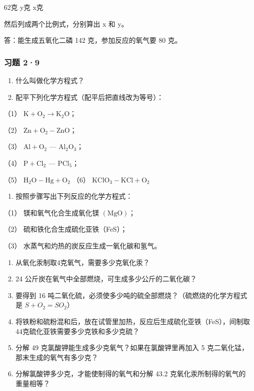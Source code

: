 62克 y克 x克

然后列成两个比例式，分别算出 x 和 y。

答：能生成五氧化二磷 142 克，参加反应的氧气要 80 克。

\subsubsection{习题 2·9}

\begin{enumerate}
\item
  什么叫做化学方程式？
\item
  配平下列化学方程式（配平后把直线改为等号）：
\end{enumerate}

（1）
\(\mathrm{K} + \mathrm{O}_2 \longrightarrow \mathrm{K}_2\mathrm{O}\)；

（2） \(\mathrm{Zn + O_2 - ZnO}\)；

（3） \(\mathrm{Al} + \mathrm{O}_2\) --- \(\mathrm{Al}_2\mathrm{O}_3\)；

（4） \(\mathrm{P} + \mathrm{Cl}_2\) --- \(\mathrm{PCl}_5\)；

（5） \(\mathrm{H}_2\mathrm{O} - \mathrm{Hg} + \mathrm{O}_2\) （6）
\(\mathrm{KClO}_3 - \mathrm{KCl} + \mathrm{O}_2\)

\begin{enumerate}[start=3]
\item
  按照步骤写出下列反应的化学方程式：
\end{enumerate}

（1） 镁和氧气化合生成氧化镁 \(\left(\mathrm{MgO}\right)\)；

（2） 硫和铁化合生成硫化亚铁（FeS）；

（3） 水蒸气和灼热的炭反应生成一氧化碳和氢气。

\begin{enumerate}[start=4]
\item
  从氧化汞制取4克氧气，需要多少克氧化汞？
\item
  24 公斤炭在氧气中全部燃烧，可生成多少公斤的二氧化碳？
\item
  要得到 16 吨二氧化硫，必须使多少吨的硫全部燃烧？（硫燃烧的化学方程式是
  \(S + O_{2} = SO_{2}\)）
\item
  将铁粉和硫粉混和后，放在试管里加热，反应后生成硫化亚铁（FeS），间制取44克硫化亚铁需要多少克铁和多少克硫？
\item
  分解 49 克氯酸钾能生成多少克氧气？如果在氯酸钾里再加入 5
  克二氧化锰，那末生成的氧气有多少克？
\item
  分解氯酸钾多少克，才能使制得的氧气和分解 43.2
  克氧化汞所制得的氧气的重量相等？
\end{enumerate}

